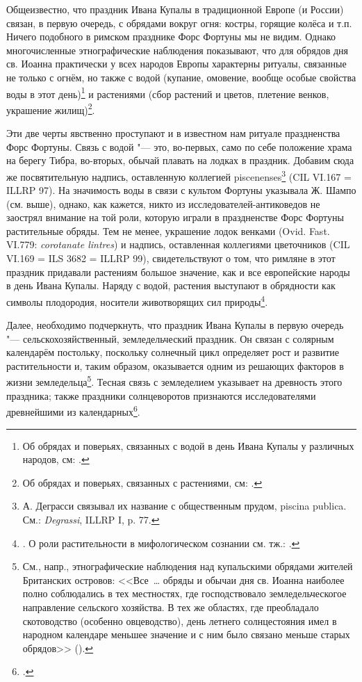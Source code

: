 Общеизвестно, что праздник Ивана Купалы в традиционной Европе (и России) связан, в первую очередь, с обрядами вокруг огня: костры, горящие колёса и т.п. Ничего подобного в римском празднике Форс Фортуны мы не видим. Однако многочисленные этнографические наблюдения показывают, что для обрядов дня св. Иоанна практически у всех народов Европы характерны ритуалы, связанные не только с огнём, но также с водой (купание, омовение, вообще особые свойства воды в этот день)\footnote{Об обрядах и поверьях, связанных с водой в день Ивана Купалы у различных народов, см: \cite[С. 10, 25, 46, 97, 121, 127, 146, 155--156, 175, 186, 209, 229, 272--273]{Calendar1978}.} и растениями (сбор растений и цветов, плетение венков, украшение жилищ)\footnote{Об обрядах и поверьях, связанных с растениями, см: \cite[С. 21, 26, 46, 49, 59, 70, 73, 96, 97, 108, 121, 126, 145, 155, 166, 175, 197, 208--209, 229--231, 249, 250, 272]{Calendar1978}.}. 

Эти две черты явственно проступают и в известном нам ритуале праздненства Форс Фортуны. Связь с водой "--- это, во-первых, само по себе положение храма на берегу Тибра, во-вторых, обычай плавать на лодках в праздник. Добавим сюда же посвятительную надпись, оставленную коллегией piscenenses\footnote{А. Деграсси связывал их название с общественным прудом, piscina publica. См.: \textit{Degrassi}, ILLRP I, p. 77.} (CIL VI.167 = ILLRP 97). На значимость воды в связи с культом Фортуны указывала Ж. Шампо (см. выше), однако, как кажется, никто из исследователей-антиковедов не заострял внимание на той роли, которую играли в праздненстве Форс Фортуны растительные обряды. Тем не менее, украшение лодок венками (Ovid. Fast. VI.779: \textit{corotanate lintres}) и надпись, оставленная коллегиями цветочников (CIL VI.169 = ILS 3682 = ILLRP 99), свидетельствуют о том, что римляне в этот праздник придавали растениям большое значение, как и все европейские народы в день Ивана Купалы. Наряду с водой, растения выступают в обрядности как символы плодородия, носители животворящих сил природы\footnote{\cite[С. 88]{Pokrovskaya1983}. О роли растительности в мифологическом сознании см. тж.: \cite[С. 251--305]{Eliade1999}.}.

Далее, необходимо подчеркнуть, что праздник Ивана Купалы в первую очередь "--- сельскохозяйственный, земледельческий праздник. Он связан с солярным календарём постольку, поскольку солнечный цикл определяет рост и развитие растительности и, таким образом, оказывается одним из решающих факторов в жизни земледельца\footnote{См., напр., этнографические наблюдения над купальскими обрядами жителей Британских островов: <<Все~\ldots{} обряды и обычаи дня св. Иоанна наиболее полно соблюдались в тех местностях, где господствовало земледельческогое направление сельского хозяйства. В тех же областях, где преобладало скотоводство (особенно овцеводство), день летнего солнцестояния имел в народном календаре меньшее значение и с ним было связано меньше старых обрядов>> (\cite[С. 74]{Calendar1978}).}. Тесная связь с земледелием указывает на древность этого праздника; также праздники солнцеворотов признаются исследователями древнейшими из календарных\footcite[С. 46]{Serov1983}.

